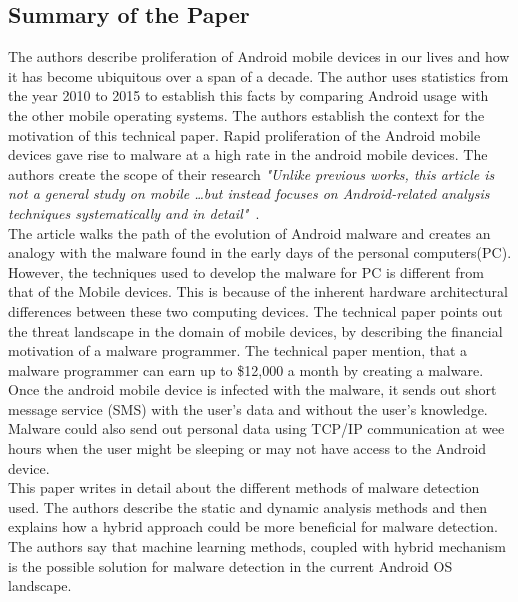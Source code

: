 \documentclass[12pt]{article}
\begin{document}
\subsection{Summary of the Paper}
The authors describe proliferation of Android mobile devices in our lives and how it has become ubiquitous over a span of a decade. The author uses statistics from the year 2010 to 2015 to establish this facts by comparing Android usage with the other mobile operating systems. The authors establish the context for the motivation of this technical paper. Rapid proliferation of the Android mobile devices gave rise to malware at a high rate in the android mobile devices. The authors create the scope of their research \textit {"Unlike previous works, this article is not a general study on mobile \ldots but instead focuses on Android-related analysis techniques systematically and in detail"}~\cite{Tam:2017:EAM:3022634.3017427}. \\
The article walks the path of the evolution of Android malware and creates an analogy with the malware found in the early days of the personal computers(PC). However, the techniques used to develop the malware for PC is different from that of the Mobile devices. This is because of the inherent hardware architectural differences between these two computing devices. The technical paper points out the threat landscape in the domain of mobile devices, by describing the financial motivation of a malware programmer. The technical paper mention, that a malware programmer can earn up to \$12,000 a month by creating a malware. Once the android mobile device is infected with the malware, it sends out short message service (SMS) with the user's data and without the user's knowledge. Malware could also send out personal data using TCP/IP communication at wee hours when the user might be sleeping or may not have access to the Android device.\\
This paper writes in detail about the different methods of malware detection used. The authors describe the static and dynamic analysis methods and then explains how a hybrid approach could be more beneficial for malware detection. The authors say that machine learning methods, coupled with hybrid mechanism is the possible solution for malware detection in the current Android OS landscape.
\end{document}
